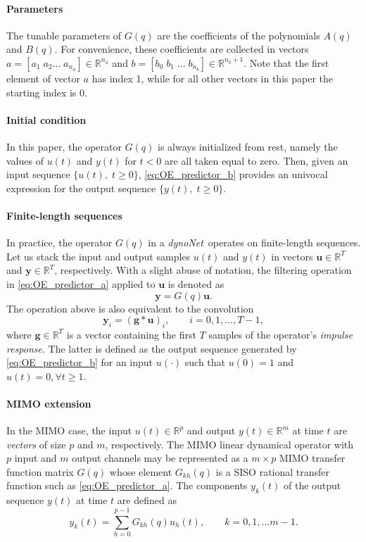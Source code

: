 \documentclass{article}
\newcommand{\R}{\mathbb{R}} %
\newcommand{\q}{q} %
\newcommand{\A}{A} %
\newcommand{\ac}{a} %
\newcommand{\B}{B} %
\newcommand{\bb}{b} %
\newcommand{\conv}{*}
\newcommand{\tvec}[1]{\mathbf{#1}}
\newcommand{\nsamp}{T}
\newcommand{\Name}{\emph{dynoNet}}
\begin{document}
\paragraph{Parameters} The tunable parameters of $G(\q)$ are the coefficients of the polynomials $\A(q)$ and $\B(q)$. For convenience, these coefficients are collected in vectors  
$\ac = [\ac_1\; \ac_2\dots\;\ac_{n_\ac}] \in \R^{n_\ac}$ and $\bb = [\bb_0\; \bb_1\; \dots \;\bb_{n_\bb}] \in \R^{n_\bb + 1}$. 
Note that the first element of vector $\ac$ has index 1, while for all other vectors in this paper the starting index is 0.


\paragraph{Initial condition} In this paper, the operator $G(\q)$ is always initialized from rest, namely the values of $u(t)$ and $y(t)$ for $t < 0$ are all taken equal to zero. Then, given an input sequence $\{u(t),\; t \geq 0\}$, \eqref{eq:OE_predictor_b} provides an univocal expression for the output sequence $\{y(t),\; t \geq 0\}$.

\paragraph{Finite-length sequences} In practice, the operator $G(\q)$ in a \Name\ operates on finite-length sequences. Let us stack the input and output samples $u(t)$ and $y(t)$ in vectors $\tvec{u} \in \mathbb{R}^{\nsamp}$  and $\tvec{y} \in \mathbb{R}^{\nsamp}$, respectively. 
With a slight abuse of notation, the filtering operation in \eqref{eq:OE_predictor_a} applied to $\tvec{u}$ is denoted as%
\begin{equation*}
\tvec{y} = G(\q)\tvec{u}.
\end{equation*}
The operation above is also equivalent to the convolution 
\begin{equation}
\label{eq:G_conv}
\tvec{y}_i = (\tvec{g} \conv \tvec{u})_i, \qquad i=0,1,\dots,\nsamp\!-\!1,
\end{equation}
where $\tvec{g} \in \R^{\nsamp}$ is a vector containing the first $\nsamp$ samples of the operator's \emph{impulse response}. The latter is defined as the output sequence generated by \eqref{eq:OE_predictor_b} for an input $u(\cdot)$ such that $u(0)=1$ and $u(t)=0, \forall t \geq 1$.

\paragraph{MIMO extension} 
In the MIMO case, the input $u(t) \in \R^{p}$ and output $y(t) \in \R^{m}$ at time $t$ are \emph{vectors} of size 
$p$ and $m$, respectively. The MIMO linear dynamical operator with $p$ input and $m$ output channels may be represented as a $m \times p$ MIMO transfer function matrix $G(\q)$ whose element $G_{kh}(\q)$ is a SISO rational transfer function such as \eqref{eq:OE_predictor_a}.
The components $y_k(t)$ of the output sequence $y(t)$ at time $t$ are defined as
\begin{equation}
y_k(t) = \sum_{h=0}^{p-1} G_{kh}(\q)u_h(t),\qquad k=0,1,\dots m-1. 
\end{equation}
\end{document}
